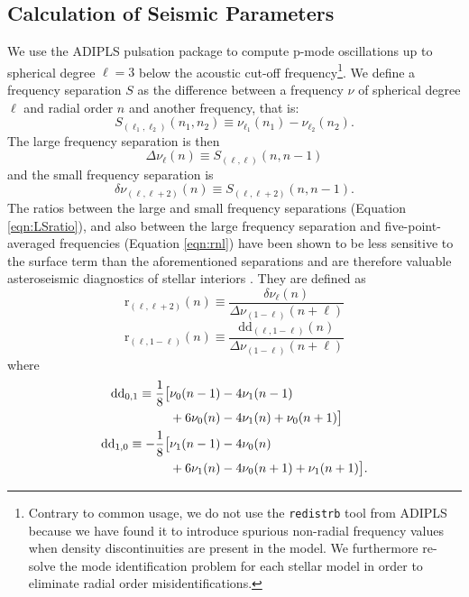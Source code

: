 \documentclass[manuscript]{aastex}
\begin{document}
\subsection{Calculation of Seismic Parameters}
\label{sec:seis}
We use the ADIPLS pulsation package \citep{2008Ap&SS.316..113C} to compute p-mode oscillations up to spherical degree $\ell=3$ below the acoustic cut-off frequency\footnote{Contrary to common usage, we do not use the \texttt{redistrb} tool from ADIPLS because we have found it to introduce spurious non-radial frequency values when density discontinuities are present in the model. We furthermore re-solve the mode identification problem for each stellar model in order to eliminate radial order misidentifications.}. We define a frequency separation $S$ as the difference between a frequency $\nu$ of spherical degree $\ell$ and radial order $n$ and another frequency, that is:
\begin{equation} 
  S_{(\ell_1, \ell_2)}(n_1, n_2) \equiv \nu_{\ell_1}(n_1) - \nu_{\ell_2}(n_2).
\end{equation}
The large frequency separation is then
\begin{equation} 
  \Delta\nu_\ell(n) \equiv S_{(\ell, \ell)}(n, n-1)
\end{equation}
and the small frequency separation is
\begin{equation}
  \delta\nu_{(\ell, \ell+2)}(n) \equiv S_{(\ell, \ell+2)}(n, n-1).
\end{equation}
The ratios between the large and small frequency separations (Equation \ref{eqn:LSratio}), and also between the large frequency separation and five-point-averaged frequencies (Equation \ref{eqn:rnl}) have been shown to be less sensitive to the surface term than the aforementioned separations and are therefore valuable asteroseismic diagnostics of stellar interiors \citep{2003A&A...411..215R}. They are defined as
\begin{equation} 
  \mathrm{r}_{(\ell,\ell+2)}(n) \equiv \frac{\delta\nu_\ell(n)}{\Delta\nu_{(1-\ell)}(n+\ell)} \label{eqn:LSratio}
\end{equation}
\begin{equation} 
  \mathrm{r}_{(\ell, 1-\ell)}(n) \equiv \frac{\mathrm{dd}_{(\ell,1-\ell)}(n)}{\Delta\nu_{(1-\ell)}(n+\ell)} \label{eqn:rnl}
\end{equation}
where
\begin{align} 
  \mathrm{dd}_{0,1} \equiv \frac{1}{8} \big[&\nu_0(n-1) - 4\nu_1(n-1) \notag\\
                                 &+6\nu_0(n) - 4\nu_1(n) + \nu_0(n+1)\big]\\ 
  \mathrm{dd}_{1,0} \equiv -\frac{1}{8} \big[&\nu_1(n-1) - 4\nu_0(n) \notag\\
                                 &+6\nu_1(n) - 4\nu_0(n+1) + \nu_1(n+1)\big].
\end{align}
\end{document}
